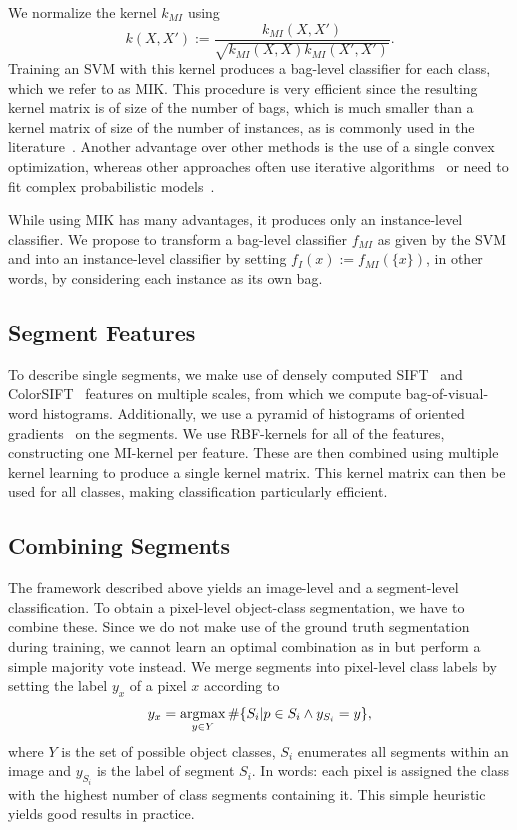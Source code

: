 We normalize the kernel $k_{MI}$ \citep{gaertner2002multi} using
\begin{equation}
k(X,X') := \frac{k_{MI}(X,X')}{\sqrt{k_{MI}(X,X)k_{MI}(X',X')}}.
\end{equation}
Training an SVM with this kernel produces a bag-level classifier for each
class, which we refer to as MIK\@.  This procedure is very efficient since
the resulting kernel matrix is of size of the number of bags, which is much smaller
than a kernel matrix of size of the number of instances, as is commonly used in the
literature~\citep{andrews2003support,nguyen2010new,zhang2008m3miml}. Another
advantage over other methods is the use of a single convex optimization,
whereas other approaches often use iterative
algorithms~\citep{andrews2003support} or need to fit complex probabilistic
models~\citep{zha2008joint}.

While using MIK has many advantages, it produces only an instance-level
classifier. We propose to transform a bag-level classifier $f_{MI}$ as given by
the SVM and  into an instance-level classifier by setting
$f_{I}(x):=f_{MI}(\{x\})$, in other words, by considering each instance as its own
bag. 

\subsection{Segment Features}

To describe single segments, we make use of densely computed
SIFT~\citep{lowe2004distinctive} and ColorSIFT~\citep{van2009evaluating}
features on multiple scales, from which we compute bag-of-visual-word histograms. Additionally, we
use a pyramid of histograms of oriented gradients~\citep{dalal2005histograms} on the
segments.  We use RBF-kernels for all of the features, constructing one
MI-kernel per feature. These are then combined using multiple kernel learning
to produce a single kernel matrix. This kernel matrix can then be used for all
classes, making classification particularly efficient.

\subsection{Combining Segments}

The framework described above yields an image-level and a segment-level
classification.  To obtain a pixel-level object-class segmentation, we have to
combine these.  Since we do not make use of the ground truth segmentation
during training, we cannot learn an optimal combination as in
\citet{li2010object} but perform a simple majority vote instead.  We merge
segments into pixel-level class labels by setting the label $y_x$ of a pixel
$x$ according to
\begin{equation}
    y_x = \operatorname*{argmax}_{y \in Y} \#\{S_i | p \in S_i \land y_{S_i}=y \},
\end{equation}
where $Y$ is the set of possible object classes, $S_i$ enumerates all segments within an
image and $y_{S_i}$ is the label of segment $S_i$. In words: each pixel is
assigned the class with the highest number of class segments containing it.
This simple heuristic yields good results in practice.

